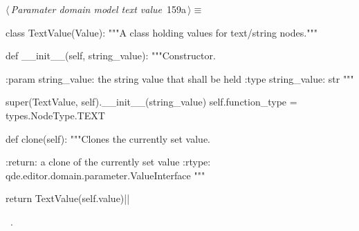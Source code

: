 \documentclass[%
    a4paper,    %
    justified,  %
    nobib,      %
    openany     %
]{tufte-book}
\begin{document}
\begin{flushleft} \small
\begin{minipage}{\linewidth}\label{scrap181}\raggedright\small
{} $\langle\,${\itshape Paramater domain model text value}\nobreak\ {\footnotesize {159a}}$\,\rangle\equiv$
\vspace{-1ex}
\begin{pythoncode}
class TextValue(Value):
    """A class holding values for text/string nodes."""

    def __init__(self, string_value):
        """Constructor.

        :param string_value: the string value that shall be held
        :type  string_value: str
        """

        super(TextValue, self).__init__(string_value)
        self.function_type = types.NodeType.TEXT

    def clone(self):
        """Clones the currently set value.

        :return: a clone of the currently set value
        :rtype:  qde.editor.domain.parameter.ValueInterface
        """

        return TextValue(self.value)|\NWsep|
\end{pythoncode}
\vspace{1.5ex}
\footnotesize
\begin{list}{}{\setlength{\itemsep}{-\parsep}\setlength{\itemindent}{-\leftmargin}}
\item \NWtxtMacroRefIn\ .

\item{}
\end{list}
\end{minipage}\vspace{4ex}
\end{flushleft}
\end{document}
